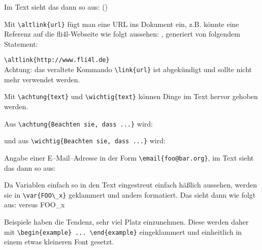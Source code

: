 \begin{description}
Im Text sieht das dann so aus: ()

\item [altlink] Mit \verb*?\altlink{url}? fügt man eine URL ins Dokument
  ein, z.B. könnte eine Referenz auf die fli4l-Webseite wie folgt aussehen:
  , generiert von folgendem Statement:

  \verb*?\altlink{http://www.fli4l.de}?\\
  Achtung: das veraltete Kommando \verb*?\link{url}? ist abgekündigt und
  sollte nicht mehr verwendet werden.

\item [achtung, wichtig] Mit \verb*?\achtung{text}? und
  \verb*?\wichtig{text}? können Dinge im Text hervor gehoben werden.

  Aus \verb*?\achtung{Beachten sie, dass ...}? wird:


  und aus \verb*?\wichtig{Beachten sie, dass ...}? wird:


\item [email] Angabe einer E--Mail--Adresse in der Form
\verb*?\email{foo@bar.org}?, im Text sieht das dann so aus:


\item [var] Da Variablen einfach so in den Text eingestreut einfach
  häßlich aussehen, werden sie in \verb*?\var{FOO\_x}? geklammert und
  anders formatiert. Das sieht dann wie folgt aus:  versus
  FOO\_x

\item [example] Beispiele haben die Tendenz, sehr viel Platz
  einzunehmen. Diese werden daher mit \verb*?\begin{example} ... \end{example}?
  eingeklammert und einheitlich in einem etwas kleineren Font gesetzt.
\end{description}

